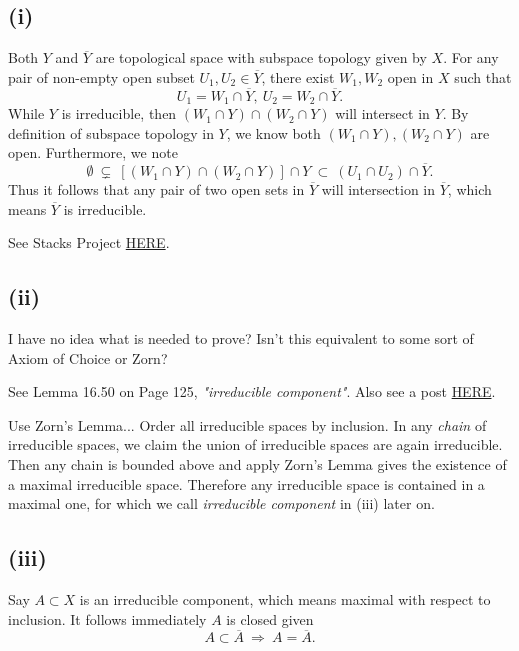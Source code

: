 \subsection{(i)}
Both $Y$ and $\overline{Y}$ are topological space with subspace topology given by $X$.
For any pair of non-empty open subset $U_1,U_2\in\overline{Y}$, there exist $W_1,W_2$ open in $X$ such that $$U_1=W_1\cap\overline{Y},~ U_2=W_2\cap\overline{Y}.$$
While $Y$ is irreducible, then $(W_1\cap Y)\cap (W_2\cap Y)$ will intersect in $Y$. By definition of subspace topology in $Y$, we know both $(W_1\cap Y),(W_2\cap Y)$ are open. Furthermore, we note
$$\emptyset~\subsetneq~[(W_1\cap Y)\cap(W_2\cap Y)]\cap Y ~\subset~ (U_1\cap U_2)\cap \overline{Y}.$$ Thus it follows that any pair of two open sets in $\overline{Y}$ will intersection in $\overline{Y}$, which means $\overline{Y}$ is irreducible.

See Stacks Project \href{https://stacks.math.columbia.edu/tag/004U}{HERE}.

\subsection{(ii)}

I have no idea what is needed to prove? Isn't this equivalent to some sort of Axiom of Choice or Zorn?

See \cite{altman} Lemma 16.50 on Page 125, \textit{"irreducible component"}. Also see a post \href{https://math.stackexchange.com/questions/1809159/show-every-irreducible-subset-of-a-topological-space-x-is-contained-in-a-maxim}{HERE}.

Use Zorn's Lemma... 
Order all irreducible spaces by inclusion. In any \textit{chain} of irreducible spaces, we claim the union of irreducible spaces are again irreducible. Then any chain is bounded above and apply Zorn's Lemma gives the existence of a maximal irreducible space. Therefore any irreducible space is contained in a maximal one, for which we call \textit{irreducible component} in (iii) later on.

\subsection{(iii)}

Say $A\subset X$ is an irreducible component, which means maximal with respect to inclusion. It follows immediately $A$ is closed given $$A\subset \overline{A} ~\Rightarrow~ A=\overline{A}.$$

